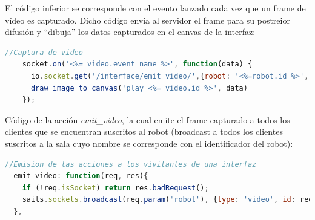 
 El código inferior se corresponde con el evento lanzado cada vez que un frame de vídeo es capturado. Dicho código envía al servidor el frame para su postreior difusión y ``dibuja'' los datos capturados en el canvas de la interfaz:\\
 
 
\begin{lstlisting}[language=JavaScript] 
    //Captura de video
    socket.on('<%= video.event_name %>', function(data) {
      io.socket.get('/interface/emit_video/',{robot: '<%=robot.id %>', id: '<%= video.id %>', msg: data });
      draw_image_to_canvas('play_<%= video.id %>', data)
    });
\end{lstlisting}


Código de la acción \emph{emit\_video}, la cual emite el frame capturado a todos los clientes que se encuentran suscritos al robot (broadcast a todos los clientes suscritos a la sala cuyo nombre se
corresponde con el identificador del robot):\\

\begin{lstlisting}[language=JavaScript] 
  //Emision de las acciones a los vivitantes de una interfaz
  emit_video: function(req, res){
    if (!req.isSocket) return res.badRequest();
    sails.sockets.broadcast(req.param('robot'), {type: 'video', id: req.param('id'), msg: req.param('msg')});
  },
\end{lstlisting}



